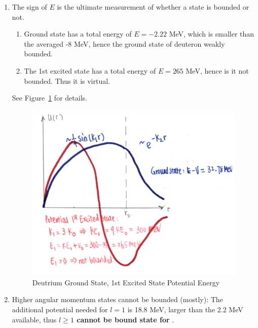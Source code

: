 \documentclass{school-22.101-notes}
\begin{document}
\begin{enumerate}
\item The sign of $E$ is the ultimate measurement of whether a state is bounded or not. 
\begin{enumerate}
\item Ground state has a total energy of $E = -2.22 $ MeV, which is smaller than the averaged -8 MeV, hence the ground state of deuteron weakly bounded. 
\item The 1st excited state has a total energy of $E = 265$ MeV, hence is it not bounded. Thus it is virtual. 
\end{enumerate}
See Figure~\ref{deuteron-bound} for details. 

\begin{figure}
    \centering
    \includegraphics[width=5in]{images/deuteron/deuteron-states.png}
    \caption{Deutrium Ground State, 1st Excited State Potential Energy}    \label{deuteron-bound}
\end{figure}

\item Higher angular momentum states cannot be bounded (mostly):
The additional potential needed for $l=1$ is 18.8 MeV, larger than the 2.2 MeV available, thus \textbf{$l \ge 1$ cannot be bound state for }. 
\end{enumerate}
\end{document}
